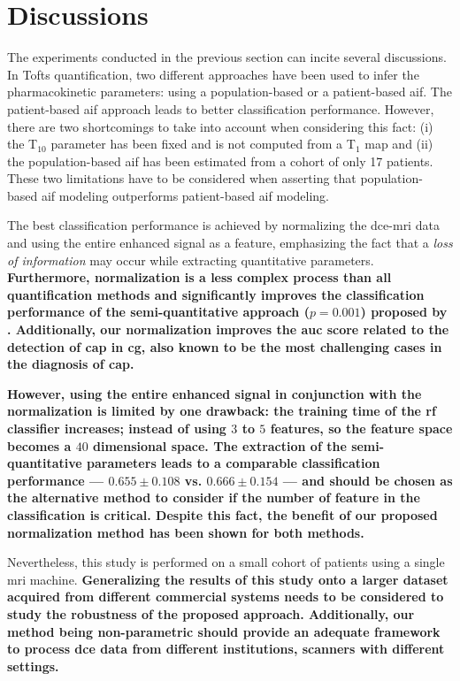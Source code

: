 \section{Discussions}\label{sec:discussions}

The experiments conducted in the previous section can incite several discussions.
In Tofts quantification, two different approaches have been used to infer the pharmacokinetic parameters: using a population-based or a patient-based \ac{aif}.
The patient-based \ac{aif} approach leads to better classification performance.
However, there are two shortcomings to take into account when considering this fact:
(i) the T$_{10}$ parameter has been fixed and is not computed from a T$_1$ map and
(ii) the population-based \ac{aif} has been estimated from a cohort of only 17 patients.
These two limitations have to be considered when asserting that
population-based \ac{aif} modeling outperforms patient-based \ac{aif} modeling.

The best classification performance is achieved by normalizing the
\ac{dce}-\ac{mri} data and using the entire enhanced signal as a
feature, emphasizing the fact that a \emph{loss of information} may occur while extracting quantitative parameters.
\textbf{Furthermore, normalization is a less complex process than all
quantification methods and significantly improves the classification
performance of the semi-quantitative approach ($p=0.001$) proposed by
\citeauthor{huisman2001accurate}.
Additionally, our normalization improves the \ac{auc} score related to
the detection of \ac{cap} in \ac{cg}, also known to be the most
challenging cases in the diagnosis of \ac{cap}.}

\textbf{However, using the entire enhanced signal in conjunction with the
normalization is limited by one drawback: the training time of the
\ac{rf} classifier increases; instead of using $3$ to $5$ features, so the
feature space becomes a $40$ dimensional space. The extraction of the
semi-quantitative parameters leads to a comparable classification performance ---
$0.655 \pm 0.108$ vs. $0.666 \pm 0.154$ --- and should be chosen as the alternative method to
consider if the number of feature in the classification is
critical. Despite this fact, the benefit of our proposed normalization method
has been shown for both methods.}

Nevertheless, this study is performed on a small cohort of patients using a single \ac{mri} machine.
\textbf{Generalizing the results of this study onto a larger dataset acquired
from different commercial systems needs to be considered to study the robustness of the proposed approach.
Additionally, our method being non-parametric should provide an
adequate framework to process \ac{dce} data from different
institutions, scanners with different settings.}

